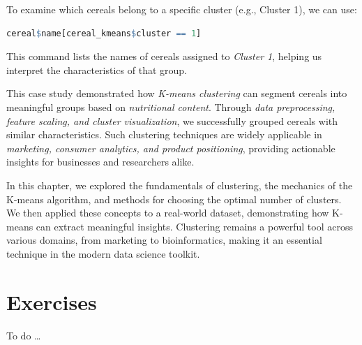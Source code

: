 \documentclass[
]{book}
\theoremstyle{definition}
\theoremstyle{definition}
\theoremstyle{definition}
\theoremstyle{definition}
\theoremstyle{remark}
\begin{document}
To examine which cereals belong to a specific cluster (e.g., Cluster 1), we can use:

\begin{lstlisting}[language=R]
cereal$name[cereal_kmeans$cluster == 1]
\end{lstlisting}

This command lists the names of cereals assigned to \emph{Cluster 1}, helping us interpret the characteristics of that group.

This case study demonstrated how \emph{K-means clustering} can segment cereals into meaningful groups based on \emph{nutritional content}. Through \emph{data preprocessing, feature scaling, and cluster visualization}, we successfully grouped cereals with similar characteristics. Such clustering techniques are widely applicable in \emph{marketing, consumer analytics, and product positioning}, providing actionable insights for businesses and researchers alike.

In this chapter, we explored the fundamentals of clustering, the mechanics of the K-means algorithm, and methods for choosing the optimal number of clusters. We then applied these concepts to a real-world dataset, demonstrating how K-means can extract meaningful insights. Clustering remains a powerful tool across various domains, from marketing to bioinformatics, making it an essential technique in the modern data science toolkit.

\section{Exercises}\label{exercises-9}

To do \ldots{}

  
\end{document}
